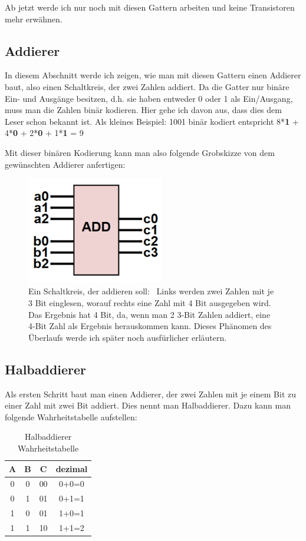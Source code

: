 \documentclass[12pt, a4paper]{article}
\begin{document}
Ab jetzt werde ich nur noch mit diesen Gattern arbeiten und keine Transistoren mehr erwähnen.


\subsection{Addierer}
In diesem Abschnitt werde ich zeigen, wie man mit diesen Gattern einen Addierer baut, also einen Schaltkreis, der zwei Zahlen addiert.
Da die Gatter nur binäre Ein- und Ausgänge besitzen, d.h. sie haben entweder 0 oder 1 als Ein/Ausgang, muss man die Zahlen binär kodieren. Hier gehe ich davon aus, dass dies dem Leser schon bekannt ist. Als kleines Beispiel: 1001 binär kodiert entspricht 8*\textbf{1} + 4*\textbf{0} + 2*\textbf{0} + 1*\textbf{1} = 9

Mit dieser binären Kodierung kann man also folgende Grobskizze von dem gewünschten Addierer anfertigen:

\begin{figure}[H]
	\begin{center}
		\includegraphics [width=6cm]{Addierer.png}
	\end{center}
	\caption{Ein Schaltkreis, der addieren soll: \ Links werden zwei Zahlen mit je 3 Bit einglesen, worauf rechts eine Zahl mit 4 Bit ausgegeben wird. Das Ergebnis hat 4 Bit, da, wenn man 2 3-Bit Zahlen addiert, eine 4-Bit Zahl als Ergebnis herauskommen kann. Dieses Phänomen des Überlaufs werde ich später noch ausfürlicher erläutern.}
\end{figure}


\subsection{Halbaddierer}
Als ersten Schritt baut man einen Addierer, der zwei Zahlen mit je einem Bit zu einer Zahl mit zwei Bit addiert. Dies nennt man Halbaddierer. Dazu kann man folgende Wahrheitstabelle aufstellen:

\begin{table}[H]
	\begin{center}
		\begin{tabular}{|c|c|c|c|} \hline
			A & B & C & dezimal \\ \hline
			0 & 0 & 00 & 0+0=0 \\
			0 & 1 & 01 & 0+1=1 \\
			1 & 0 & 01 & 1+0=1 \\
			1 & 1 & 10 & 1+1=2 \\ \hline
		\end{tabular}\\
	\end{center}
	\caption{Halbaddierer Wahrheitstabelle}
\end{table}
\end{document}
